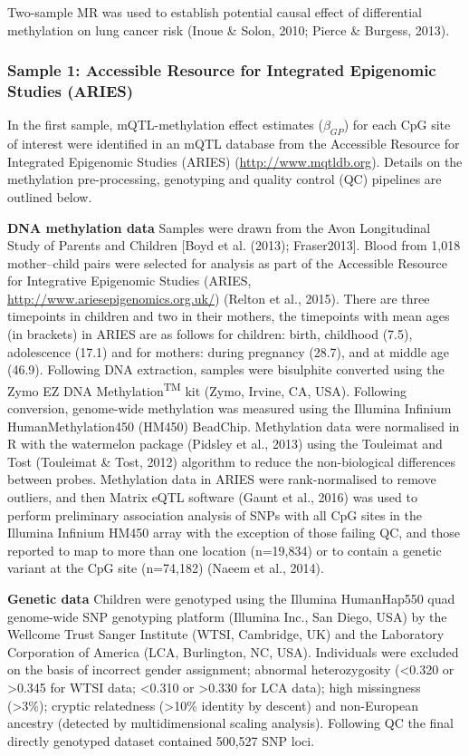 \documentclass[11pt,twoside]{bristolthesis}
\begin{document}
Two-sample MR was used to establish potential causal effect of differential methylation on lung cancer risk (Inoue \& Solon, 2010; Pierce \& Burgess, 2013).

\hypertarget{sample-1-accessible-resource-for-integrated-epigenomic-studies-aries}{%
\subsubsection{Sample 1: Accessible Resource for Integrated Epigenomic Studies (ARIES)}\label{sample-1-accessible-resource-for-integrated-epigenomic-studies-aries}}

In the first sample, mQTL-methylation effect estimates (\(\beta_{GP}\)) for each CpG site of interest were identified in an mQTL database from the Accessible Resource for Integrated Epigenomic Studies (ARIES) (\url{http://www.mqtldb.org}). Details on the methylation pre-processing, genotyping and quality control (QC) pipelines are outlined below.

\textbf{DNA methylation data}
Samples were drawn from the Avon Longitudinal Study of Parents and Children {[}Boyd et al. (2013); Fraser2013{]}. Blood from 1,018 mother--child pairs were selected for analysis as part of the Accessible Resource for Integrative Epigenomic Studies (ARIES, \url{http://www.ariesepigenomics.org.uk/}) (Relton et al., 2015). There are three timepoints in children and two in their mothers, the timepoints with mean ages (in brackets) in ARIES are as follows for children: birth, childhood (7.5), adolescence (17.1) and for mothers: during pregnancy (28.7), and at middle age (46.9). Following DNA extraction, samples were bisulphite converted using the Zymo EZ DNA Methylation\textsuperscript{TM} kit (Zymo, Irvine, CA, USA). Following conversion, genome-wide methylation was measured using the Illumina Infinium HumanMethylation450 (HM450) BeadChip. Methylation data were normalised in R with the watermelon package (Pidsley et al., 2013) using the Touleimat and Tost (Touleimat \& Tost, 2012) algorithm to reduce the non-biological differences between probes. Methylation data in ARIES were rank-normalised to remove outliers, and then Matrix eQTL software (Gaunt et al., 2016) was used to perform preliminary association analysis of SNPs with all CpG sites in the Illumina Infinium HM450 array with the exception of those failing QC, and those reported to map to more than one location (n=19,834) or to contain a genetic variant at the CpG site (n=74,182) (Naeem et al., 2014).

\textbf{Genetic data}
Children were genotyped using the Illumina HumanHap550 quad genome-wide SNP genotyping platform (Illumina Inc., San Diego, USA) by the Wellcome Trust Sanger Institute (WTSI, Cambridge, UK) and the Laboratory Corporation of America (LCA, Burlington, NC, USA). Individuals were excluded on the basis of incorrect gender assignment; abnormal heterozygosity (\textless0.320 or \textgreater0.345 for WTSI data; \textless0.310 or \textgreater0.330 for LCA data); high missingness (\textgreater3\%); cryptic relatedness (\textgreater10\% identity by descent) and non-European ancestry (detected by multidimensional scaling analysis). Following QC the final directly genotyped dataset contained 500,527 SNP loci.
\end{document}
